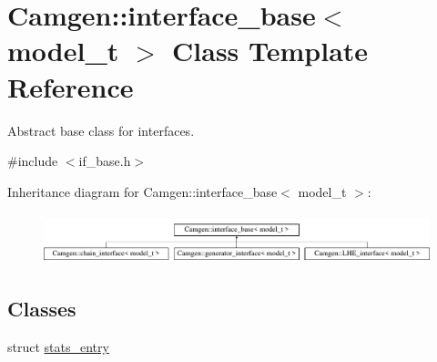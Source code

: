 \hypertarget{a00313}{\section{Camgen\-:\-:interface\-\_\-base$<$ model\-\_\-t $>$ Class Template Reference}
\label{a00313}
}


Abstract base class for interfaces.  




{\ttfamily \#include $<$if\-\_\-base.\-h$>$}

Inheritance diagram for Camgen\-:\-:interface\-\_\-base$<$ model\-\_\-t $>$\-:\begin{figure}[H]
\begin{center}
\leavevmode
\includegraphics[height=1.487384cm]{a00313}
\end{center}
\end{figure}
\subsection*{Classes}
\begin{DoxyCompactItemize}
\item 
struct \hyperlink{a00510}{stats\-\_\-entry}
\end{DoxyCompactItemize}
